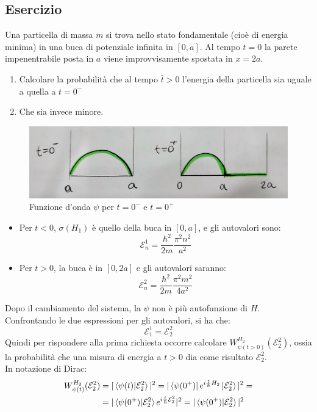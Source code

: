 \documentclass[../../FisicaTeorica.tex]{subfiles}
\begin{document}
\subsection{Esercizio}
Una particella di massa $m$ si trova nello stato fondamentale (cioè di energia minima) in una buca di potenziale infinita in $[0,a]$. Al tempo $t = 0$ la parete impenentrabile posta in $a$ viene improvvisamente spostata in $x=2a$. \begin{enumerate}
\item Calcolare la probabilità che al tempo $\bar{t}>0$ l'energia della particella sia uguale a quella a $t=0^-$
\item Che sia invece minore.
\end{enumerate}
\begin{figure}[H]
\centering
\includegraphics[scale=0.3]{Immagini/Im5.jpeg}
\caption{Funzione d'onda $\psi$ per $t=0^-$ e $t=0^+$}
\end{figure}
\begin{itemize}
\item Per $t<0$, $\sigma(H_1)$ è quello della buca in $[0,a]$, e gli autovalori sono:
\[
\mathcal{E}^1_n = \frac{\hbar^2}{2m}\frac{\pi^2 n^2}{a^2}
\]
\item Per $t>0$, la buca è in $[0,2a]$ e gli autovalori saranno:
\[
\mathcal{E}^2_n = \frac{\hbar^2}{2m}\frac{\pi^2 m^2}{4a^2}
\]
\end{itemize}
Dopo il cambiamento del sistema, la $\psi$ non è più autofunzione di $H$. Confrontando le due espressioni per gli autovalori, si ha che:
\[
\mathcal{E}^1_1 = \mathcal{E}^2_2
\]
Quindi per rispondere alla prima richiesta occorre calcolare $W_{\psi(t>0)}^{H_2} (\mathcal{E}_2^2)$, ossia la probabilità che una misura di energia a $t>0$ dia come risultato $\mathcal{E}_2^2$.\\
In notazione di Dirac:
\begin{align*}
W_{\psi(t)}^{H_2}(\mathcal{E}_2^2)&=|\braket{\psi(t)|\mathcal{E}_2^2}|^2 = |\bra{\psi(0^+)}e^{i\frac{t}{\hbar}H_2}\ket{\mathcal{E}_2^2}|^2 = \\
&=|\braket{\psi(0^+)|\mathcal{E}^2_2} e^{i\frac{t}{\hbar}\mathcal{E}_2^2}|^2 = |\braket{\psi(0^+)|\mathcal{E}_2^2}|^2
\end{align*}
\end{document}
